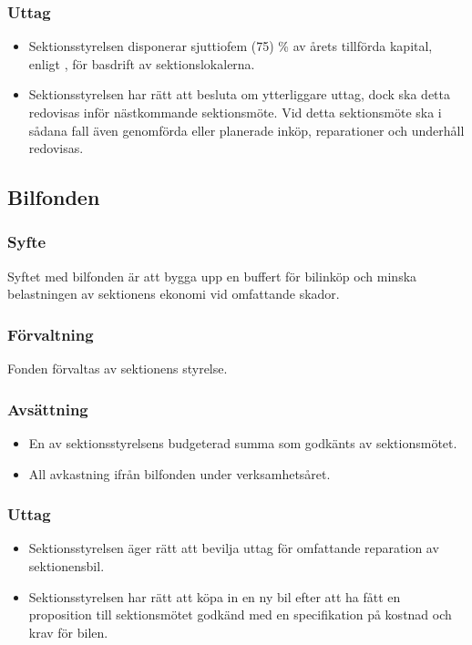 \documentclass[a4paper]{dtek}
\begin{document}
\subsubsection{Uttag}
\begin{itemize}
\item Sektionsstyrelsen disponerar sjuttiofem (75) \% av årets tillförda kapital, enligt , för basdrift av sektionslokalerna.
\item Sektionsstyrelsen har rätt att besluta om ytterliggare uttag, dock ska detta redovisas inför nästkommande sektionsmöte. Vid detta sektionsmöte ska i sådana fall även genomförda eller planerade inköp, reparationer och underhåll redovisas.
\end{itemize}

\subsection{Bilfonden}
\subsubsection{Syfte}
\label{sec:bilfond_syfte}
Syftet med bilfonden är att bygga upp en buffert för bilinköp och minska belastningen av sektionens ekonomi vid omfattande skador.
\subsubsection{Förvaltning}
Fonden förvaltas av sektionens styrelse.
\subsubsection{Avsättning}
\begin{itemize}
\item En av sektionsstyrelsens budgeterad summa som godkänts av sektionsmötet.
\item All avkastning ifrån bilfonden under verksamhetsåret.
\end{itemize}
\subsubsection{Uttag}
\begin{itemize}
    \item Sektionsstyrelsen äger rätt att bevilja uttag för omfattande reparation av sektionensbil.
    \item Sektionsstyrelsen har rätt att köpa in en ny bil efter att ha fått en proposition till sektionsmötet godkänd med en specifikation på kostnad och krav för bilen.
\end{itemize}
\end{document}
